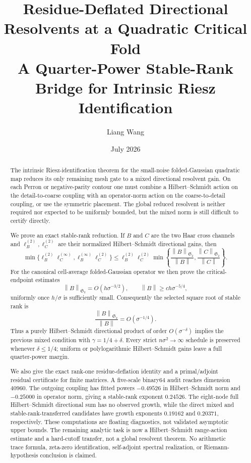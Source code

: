 \documentclass[11pt]{article}
\title{Residue-Deflated Directional Resolvents at a Quadratic Critical Fold\\
\large A Quarter-Power Stable-Rank Bridge for Intrinsic Riesz Identification}
\author{Liang Wang}
\date{July 2026}
\theoremstyle{definition}
\theoremstyle{remark}
\newcommand{\HS}{\mathfrak S_2}
\newcommand{\norm}[1]{\left\lVert #1\right\rVert}
\begin{document}
\maketitle

\begin{abstract}
The intrinsic Riesz-identification theorem for the small-noise
folded-Gaussian quadratic map reduces its only remaining mesh gate to a
mixed directional resolvent gain.  On each Perron or negative-parity contour
one must combine a Hilbert--Schmidt action on the detail-to-coarse coupling
with an operator-norm action on the coarse-to-detail coupling, or use the
symmetric placement.  The global reduced resolvent is neither required nor
expected to be uniformly bounded, but the mixed norm is still difficult to
certify directly.

We prove an exact stable-rank reduction.  If
\(B\) and \(C\) are the two Haar cross channels and
\(\ell_B^{(2)},\ell_C^{(2)}\) are their normalized Hilbert--Schmidt
directional gains, then
\[
 \min\{\ell_B^{(2)}\ell_C^{(\infty)},
        \ell_B^{(\infty)}\ell_C^{(2)}\}
 \le
 \ell_B^{(2)}\ell_C^{(2)}
 \min\!\left\{
 \frac{\norm{B}_{\HS}}{\norm B},
 \frac{\norm{C}_{\HS}}{\norm C}
 \right\}.
\]
For the canonical cell-average folded-Gaussian operator we then prove the
critical-endpoint estimates
\[
 \norm{B}_{\HS}=O(h\sigma^{-3/2}),
 \qquad
 \norm B\ge c h\sigma^{-5/4},
\]
uniformly once \(h/\sigma\) is sufficiently small.  Consequently the
selected square root of stable rank is
\[
 \frac{\norm B_{\HS}}{\norm B}=O(\sigma^{-1/4}).
\]
Thus a purely Hilbert--Schmidt directional product of order
\(O(\sigma^{-\delta})\) implies the previous mixed condition with
\(\gamma=1/4+\delta\).  Every strict \(n\sigma^2\to\infty\) schedule is
preserved whenever \(\delta\le1/4\); uniform or polylogarithmic
Hilbert--Schmidt gains leave a full quarter-power margin.

We also give the exact rank-one residue-deflation identity and a
primal/adjoint residual certificate for finite matrices.  A five-scale
binary64 audit reaches dimension \(40960\).  The outgoing coupling has fitted
powers \(-0.49526\) in Hilbert--Schmidt norm and \(-0.25000\) in operator
norm, giving a stable-rank exponent \(0.24526\).  The eight-node full
Hilbert--Schmidt directional sum has no observed growth, while the direct
mixed and stable-rank-transferred candidates have growth exponents
\(0.19162\) and \(0.20371\), respectively.  These computations are floating
diagnostics, not validated asymptotic upper bounds.  The remaining analytic
task is now a Hilbert--Schmidt range-action estimate and a hard-cutoff
transfer, not a global resolvent theorem.  No arithmetic trace formula,
zeta-zero identification, self-adjoint spectral realization, or
Riemann-hypothesis conclusion is claimed.
\end{abstract}
\end{document}
